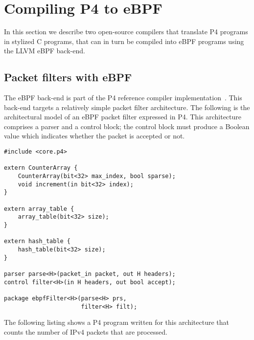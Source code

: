 \section{Compiling P4 to eBPF}\label{sec:compilation}

In this section we describe two open-source compilers that translate
P4 programs in stylized C programs, that can in turn be compiled into
eBPF programs using the LLVM eBPF back-end.

\subsection{Packet filters with eBPF}\label{sec:ebpf}

The eBPF back-end is part of the P4 reference compiler
implementation~\cite{p4-ebpf-backend}.  This back-end targets a
relatively simple packet filter architecture.  The following is the
architectural model of an eBPF packet filter expressed in P4.  This
architecture comprises a parser and a control block; the control block
must produce a Boolean value which indicates whether the packet is
accepted or not.

\begin{lstlisting}
#include <core.p4>

extern CounterArray {
    CounterArray(bit<32> max_index, bool sparse);
    void increment(in bit<32> index);
}

extern array_table {
    array_table(bit<32> size);
}

extern hash_table {
    hash_table(bit<32> size);
}

parser parse<H>(packet_in packet, out H headers);
control filter<H>(in H headers, out bool accept);

package ebpfFilter<H>(parse<H> prs,
                      filter<H> filt);
\end{lstlisting}

The following listing shows a P4 program written for this architecture
that counts the number of IPv4 packets that are processed.

